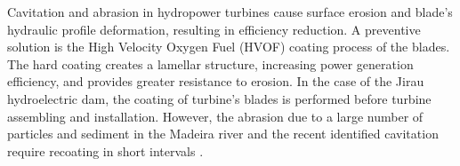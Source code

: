 Cavitation and abrasion in hydropower turbines cause surface erosion and
blade's hydraulic profile deformation, resulting in efficiency
reduction. A preventive solution is the High Velocity Oxygen Fuel (HVOF) coating
process of the blades. The hard coating creates a lamellar structure,
increasing power generation efficiency, and provides greater
resistance to erosion. In the case of the Jirau hydroelectric dam, the coating
of turbine's blades is performed before turbine assembling and
installation. However, the abrasion due to a large number
of particles and sediment in the Madeira river and the recent identified
cavitation require recoating in short intervals \citep{santa2009slurry}.%


